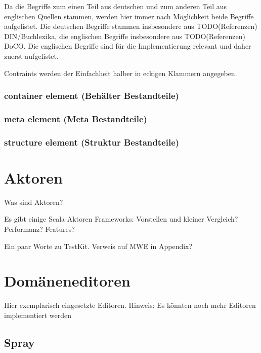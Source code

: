 Da die Begriffe zum einen Teil aus deutschen und zum anderen Teil aus englischen Quellen
stammen, werden hier immer nach Möglichkeit beide Begriffe aufgelistet.
Die deutschen Begriffe stammen insbesondere aus TODO(Referenzen) DIN/Buchlexika,
die englischen Begriffe insbesondere aus TODO(Referenzen) DoCO.
Die englischen Begriffe sind für die Implementierung relevant und daher zuerst aufgelistet.

Contraints werden der Einfachheit halber in eckigen Klammern angegeben.

\subsubsection{container element (Behälter Bestandteile)}



\subsubsection{meta element (Meta Bestandteile)}



\subsubsection{structure element (Struktur Bestandteile)}



\section{Aktoren}

Was sind Aktoren?

Es gibt einige Scala Aktoren Frameworks: Vorstellen und kleiner Vergleich?
Performanz? Features?

Ein paar Worte zu TestKit. Verweis auf MWE in Appendix?


\section{Domäneneditoren}

Hier exemplarisch eingesetzte Editoren. Hinweis: Es könnten noch mehr
Editoren implementiert werden

\subsection{Spray}

